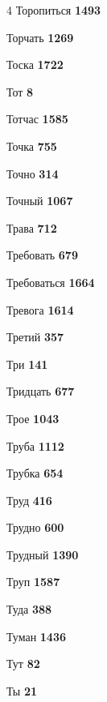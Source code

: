 \begin{multicols}{4}
\noindent Торопиться \dotfill \textbf{\color{secondary} 1493}\par
\noindent Торчать \dotfill \textbf{\color{secondary} 1269}\par
\noindent Тоска \dotfill \textbf{\color{secondary} 1722}\par
\noindent Тот \dotfill \textbf{\color{secondary} 8}\par
\noindent Тотчас \dotfill \textbf{\color{secondary} 1585}\par
\noindent Точка \dotfill \textbf{\color{secondary} 755}\par
\noindent Точно \dotfill \textbf{\color{secondary} 314}\par
\noindent Точный \dotfill \textbf{\color{secondary} 1067}\par
\noindent Трава \dotfill \textbf{\color{secondary} 712}\par
\noindent Требовать \dotfill \textbf{\color{secondary} 679}\par
\noindent Требоваться \dotfill \textbf{\color{secondary} 1664}\par
\noindent Тревога \dotfill \textbf{\color{secondary} 1614}\par
\noindent Третий \dotfill \textbf{\color{secondary} 357}\par
\noindent Три \dotfill \textbf{\color{secondary} 141}\par
\noindent Тридцать \dotfill \textbf{\color{secondary} 677}\par
\noindent Трое \dotfill \textbf{\color{secondary} 1043}\par
\noindent Труба \dotfill \textbf{\color{secondary} 1112}\par
\noindent Трубка \dotfill \textbf{\color{secondary} 654}\par
\noindent Труд \dotfill \textbf{\color{secondary} 416}\par
\noindent Трудно \dotfill \textbf{\color{secondary} 600}\par
\noindent Трудный \dotfill \textbf{\color{secondary} 1390}\par
\noindent Труп \dotfill \textbf{\color{secondary} 1587}\par
\noindent Туда \dotfill \textbf{\color{secondary} 388}\par
\noindent Туман \dotfill \textbf{\color{secondary} 1436}\par
\noindent Тут \dotfill \textbf{\color{secondary} 82}\par
\noindent Ты \dotfill \textbf{\color{secondary} 21}\par

\end{multicols}
